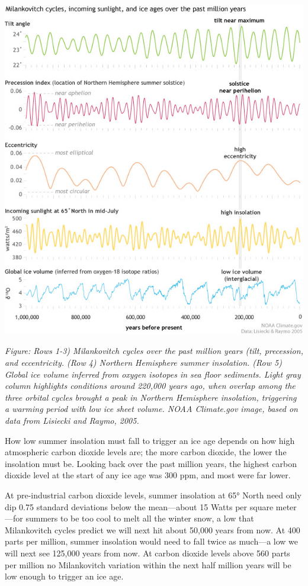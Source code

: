 \documentclass[
]{book}
\begin{document}
\includegraphics{fig/orbital_cycles_sunlight_ice.jpg}

\emph{Figure: Rows 1-3) Milankovitch cycles over the past million years (tilt, precession, and eccentricity. (Row 4) Northern Hemisphere summer insolation. (Row 5) Global ice volume inferred from oxygen isotopes in sea floor sediments. Light gray column highlights conditions around 220,000 years ago, when overlap among the three orbital cycles brought a peak in Northern Hemisphere insolation, triggering a warming period with low ice sheet volume. NOAA Climate.gov image, based on data from Lisiecki and Raymo, 2005.}

How low summer insolation must fall to trigger an ice age depends on how high atmospheric carbon dioxide levels are; the more carbon dioxide, the lower the insolation must be. Looking back over the past million years, the highest carbon dioxide level at the start of any ice age was 300 ppm, and most were far lower.

At pre-industrial carbon dioxide levels, summer insolation at 65° North need only dip 0.75 standard deviations below the mean---about 15 Watts per square meter---for summers to be too cool to melt all the winter snow, a low that Milankovitch cycles predict we will next hit about 50,000 years from now. At 400 parts per million, summer insolation would need to fall twice as much---a low we will next see 125,000 years from now. At carbon dioxide levels above 560 parts per million no Milankovitch variation within the next half million years will be low enough to trigger an ice age.
\end{document}
